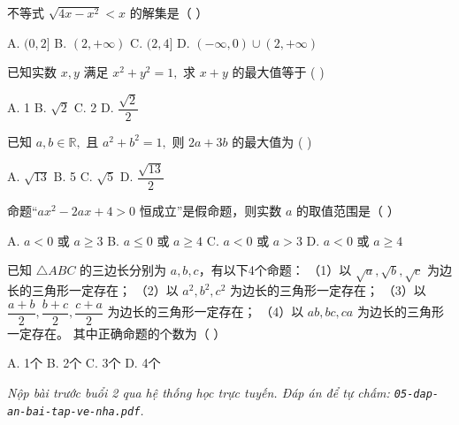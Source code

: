 \documentclass[11pt, a4paper]{article}
\begin{document}
\begin{baitap}[11]
不等式 $\sqrt{4x - x^2} < x$ 的解集是（ ）
\par\vspace{3pt}
\noindent A. $(0, 2]$ \quad B. $(2, +\infty)$ \quad C. $(2, 4]$ \quad D. $(-\infty, 0) \cup (2, +\infty)$
\end{baitap}

\begin{baitap}[12]
已知实数 $x, y$ 满足 $x^2 + y^2 = 1,$ 求 $x + y$ 的最大值等于 ( )
\par\vspace{3pt}
\noindent A. 1 \quad B. $\sqrt{2}$ \quad C. 2 \quad D. $\dfrac{\sqrt{2}}{2}$
\end{baitap}

\begin{baitap}[13]
已知 $a, b \in \mathbb{R},$ 且 $a^2 + b^2 = 1,$ 则 $2a + 3b$ 的最大值为 ( )
\par\vspace{3pt}
\noindent A. $\sqrt{13}$ \quad B. 5 \quad C. $\sqrt{5}$ \quad D. $\dfrac{\sqrt{13}}{2}$
\end{baitap}

\begin{baitap}[14]
命题“$ax^2 - 2ax + 4 > 0$ 恒成立”是假命题，则实数 $a$ 的取值范围是（ ）
\par\vspace{3pt}
\noindent A. $a < 0$ 或 $a \geq 3$ \quad B. $a \leq 0$ 或 $a \geq 4$ \quad C. $a < 0$ 或 $a > 3$ \quad D. $a < 0$ 或 $a \geq 4$
\end{baitap}

\begin{baitap}[15]
已知 $\triangle ABC$ 的三边长分别为 $a, b, c$，有以下4个命题： （1）以 $\sqrt{a}, \sqrt{b}, \sqrt{c}$ 为边长的三角形一定存在； （2）以 $a^2, b^2, c^2$ 为边长的三角形一定存在； （3）以 $\dfrac{a+b}{2}, \dfrac{b+c}{2}, \dfrac{c+a}{2}$ 为边长的三角形一定存在； （4）以 $ab, bc, ca$ 为边长的三角形一定存在。 其中正确命题的个数为（ ）
\par\vspace{3pt}
\noindent A. 1个 \quad B. 2个 \quad C. 3个 \quad D. 4个
\end{baitap}

\vspace{0.3cm}
\noindent\emph{Nộp bài trước buổi 2 qua hệ thống học trực tuyến. Đáp án để tự chấm: \texttt{05-dap-an-bai-tap-ve-nha.pdf}.}
\end{document}
